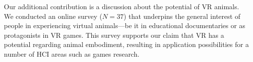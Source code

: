 \documentclass[conference]{IEEEtran}
\begin{document}

Our additional contribution is a discussion about the potential of VR animals. We conducted an online survey ($N=37$) that underpins the general interest of people in experiencing virtual animals---be it in educational documentaries or as protagonists in VR games. This survey supports our claim that VR has a potential regarding animal embodiment, resulting in application possibilities for a number of HCI areas such as games research.
 
\end{document}
